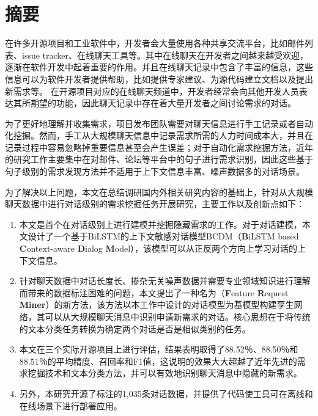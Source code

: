 \maketitle%
\MAKETITLE%
\makedeclaration%
\intobmk\chapter*{摘\quad 要}%
\setcounter{page}{1}%

在许多开源项目和工业软件中，开发者会大量使用各种共享交流平台，比如邮件列表、issue tracker、在线聊天工具等。其中在线聊天在开发者之间越来越受欢迎，逐渐在软件开发中起着重要的作用。并且在线聊天记录中包含了丰富的信息，这些信息可以为软件开发者提供帮助，比如提供专家建议、为源代码建立文档以及提出新需求等。
在开源项目对应的在线聊天频道中，开发者经常会向其他开发人员表达其所期望的功能，因此聊天记录中存在着大量开发者之间讨论需求的对话。

为了更好地理解并收集需求，项目发布团队需要对聊天信息进行手工记录或者自动化挖掘。然而，手工从大规模聊天信息中记录需求所需的人力时间成本大，并且在记录过程中容易忽略掉重要信息甚至会产生误差；对于自动化需求挖掘方法，近年的研究工作主要集中在对邮件、论坛等平台中的句子进行需求识别，因此这些基于句子级别的需求发现方法并不适用于上下文信息丰富、噪声数据多的对话场景。

为了解决以上问题，本文在总结调研国内外相关研究内容的基础上，针对从大规模聊天数据中进行对话级别的需求挖掘任务开展研究，主要工作以及创新点如下：
\setlist[enumerate]{}%
\begin{enumerate}[nosep]
    \item 本文是首个在对话级别上进行建模并挖掘隐藏需求的工作。对于对话建模，本文设计了一个基于BiLSTM的上下文敏感对话模型BCDM（\textbf{B}iLSTM based \textbf{C}ontext-aware \textbf{D}ialog \textbf{M}odel），该模型可以从正反两个方向上学习对话的上下文信息。
    \item 针对聊天数据中对话长度长、掺杂无关噪声数据并需要专业领域知识进行理解而带来的数据标注困难的问题，本文提出了一种名为{\tool}（\textbf{F}eature \textbf{R}equest \textbf{Miner}）的新方法，该方法以本工作中设计的对话模型{\dm}为基模型构建孪生网络，其可以从大规模聊天消息中识别申请新需求的对话。{\tool}核心思想在于将传统的文本分类任务转换为确定两个对话是否是相似类别的任务。
    \item 本文在三个实际开源项目上进行评估，结果表明{\tool}取得了88.52％、88.50％和88.51％的平均精度、召回率和F1值，这说明{\tool}的效果大大超越了近年先进的需求挖掘技术和文本分类方法，并可以有效地识别聊天消息中隐藏的新需求。
    \item 另外，本研究开源了标注的1,035条对话数据，并提供了代码使{\tool}工具可在离线和在线场景下进行部署应用。
\end{enumerate}

